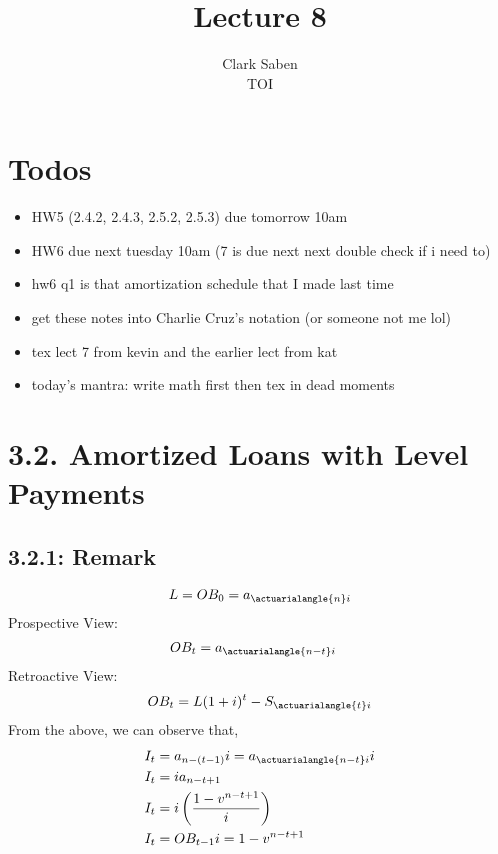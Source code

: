 \documentclass[12pt]{article}
\begin{document}
 
 
\title{Lecture 8}%
\author{Clark Saben\\ %
TOI} %
 
\maketitle

\section{Todos}

\begin{itemize}
	\item HW5 (2.4.2, 2.4.3, 2.5.2, 2.5.3) due tomorrow 10am
	\item HW6 due next tuesday 10am (7 is due next next double check if i need to)
	\item hw6 q1 is that amortization schedule that I made last time
	\item get these notes into Charlie Cruz's notation (or someone not me lol)
	\item tex lect 7 from kevin and the earlier lect from kat
	\item today's mantra: write math first then tex in dead moments
\end{itemize}

\section{3.2. Amortized Loans with Level Payments}
\subsection{3.2.1: Remark}
$$L = OB_{0}= a_{\actuarialangle{n}i}$$
Prospective View:
$$\begin{aligned}
	OB_t &= a_{\actuarialangle{n-t}i}
\end{aligned}$$
Retroactive View:
$$\begin{aligned}
	OB_t &= L(1+i)^{t} - S_{\actuarialangle{t}i} \\
\end{aligned}$$
From the above, we can observe that,
$$\begin{aligned}
	I_t &= a_{n-(t-1)}i = a_{\actuarialangle{n-t}i}i\\
	I_t &= ia_{n-t+1}\\
	I_t &= i \left(\frac{1-v^{n-t+1}}{i}\right)\\
	I_t &= OB_{t-1}i = 1-v^{n-t+1}\\
\end{aligned}$$
\end{document}
